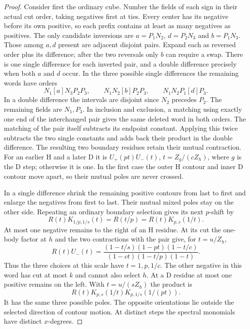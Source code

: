 \begin{proof}
Consider first the ordinary cube. Number the fields of each sign in
their actual cut order, taking negatives first at ties. Every center
has its negative before its own positive, so each prefix contains at
least as many negatives as positives. The only candidate inversions are
$a=P_1N_2$, $d=P_2N_3$ and $b=P_1N_3$. Those among $a,d$ present
are adjacent disjoint pairs. Expand each as reversed order plus its
difference; after the two reversals only $b$ can require a swap.
There is one single difference for each inverted pair, and a double
difference precisely when both $a$ and $d$ occur. In the three possible
single differences the remaining words have orders
\[
 N_1[a]N_3P_2P_3,\qquad N_1N_2[b]P_2P_3,\qquad
 N_1N_2P_1[d]P_3 .
\]
In a double difference the intervals are disjoint since $N_2$
precedes $P_2$. The remaining fields are $N_1,P_3$.
In inclusion and exclusion, a matching using exactly one end of the
interchanged pair gives the same deleted word in both orders. The
matching of the pair itself subtracts its endpoint constant. Applying
this twice subtracts the two single constants and adds back their
product in the double difference. The resulting two boundary residues
retain their mutual contraction. For an earlier H and a later D it is
$U_+(pt)U_-(t)$, $t=Z_g/(cZ_h)$, where $g$ is the D step; otherwise
it is one. In the first case the outer H contour and inner D contour
move apart, so their mutual poles are never crossed.

In a single difference shrink the remaining positive contours from last
to first and enlarge the negatives from first to last. Their mutual
mixed poles stay on the other side. Repeating an ordinary boundary
selection gives its next $p$-shift by
\[
 R(t)K_{1/p,1/s}(t)=R(t/p)=R(t)K_{p,s}(1/t).
\]
At most one negative remains to the right of an H residue. At its
cut the one-body factor at $h$ and the two contractions with the pair
give, for $t=u/Z_h$,
\[
 R(t)U_-(t)=
 \frac{(1-t/s)(1-pt)(1-t/c)}
      {(1-ct)(1-t/p)(1-t)} .
\]
Thus the three choices at this scale have $t=1,p,1/c$. The other
negative in this word has cut at most $k$ and cannot also select $h$.
At a D residue at most one positive remains on the left. With
$t=u/(sZ_h)$ the product is
\[
 R(t)K_{p,s}(1/t)K_{p,1/s}(1/(pt)).
\]
It has the same three possible poles. The opposite orientations lie
outside the selected direction of contour motion. At distinct steps
the spectral monomials have distinct $x$-degrees.


\end{proof}
